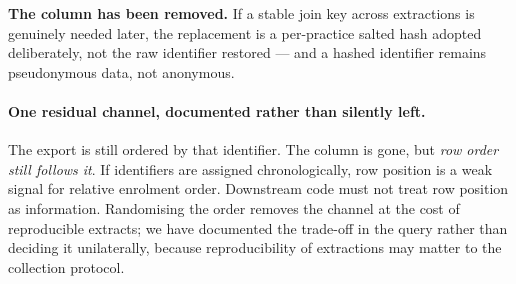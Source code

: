 \textbf{The column has been removed.} If a stable join key across extractions is genuinely needed
later, the replacement is a per-practice salted hash adopted deliberately, not the raw identifier
restored --- and a hashed identifier remains pseudonymous data, not anonymous.

\paragraph{One residual channel, documented rather than silently left.} The export is still ordered
by that identifier. The column is gone, but \emph{row order still follows it}. If identifiers are
assigned chronologically, row position is a weak signal for relative enrolment order. Downstream code
must not treat row position as information. Randomising the order removes the channel at the cost of
reproducible extracts; we have documented the trade-off in the query rather than deciding it
unilaterally, because reproducibility of extractions may matter to the collection protocol.
